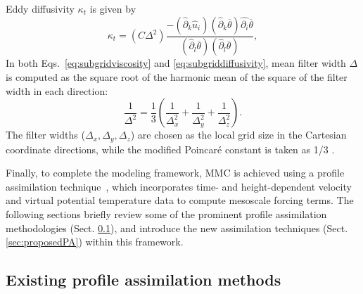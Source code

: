 Eddy diffusivity $\kappa_t$ is given by 
\begin{equation}
\kappa_t=\left(C \Delta^2\right)\frac{-\left(\hat{\partial}_k \hat{u}_i\right)\left(\hat{\partial}_k \overline \theta\right) \hat{\partial_i} \overline \theta}{\left(\hat{\partial}_l \overline \theta\right)\left(\hat{\partial}_l \overline \theta\right)},
\label{eq:subgriddiffusivity}
\end{equation}
In both Eqs.~\ref{eq:subgridviscosity} and \ref{eq:subgriddiffusivity}, mean filter width $\Delta$ is computed as the square root of the harmonic mean of the square of the filter width in each direction:
\begin{equation}
\frac{1}{\Delta^2}=\frac{1}{3}\left(\frac{1}{\Delta_x^2}+\frac{1}{\Delta_y^2}+\frac{1}{\Delta_z^2}\right).
\end{equation}
The filter widths ($\Delta_x, \Delta_y, \Delta_z$) are chosen as the local grid size in the Cartesian coordinate directions, while the modified Poincar\'e constant is taken as 1/3 \citep{Abkar2017}.

Finally, to complete the modeling framework, MMC is achieved using a profile assimilation technique~\citep{allaerts2020development}, which incorporates time- and height-dependent velocity and virtual potential temperature data to compute mesoscale forcing terms. The following sections briefly review some of the prominent profile assimilation methodologies (Sect. \ref{sec:exitingPA}), and introduce the new assimilation techniques (Sect. \ref{sec:proposedPA}) within this framework.

\subsection{\textbf{Existing profile assimilation methods}}
\label{sec:exitingPA}
